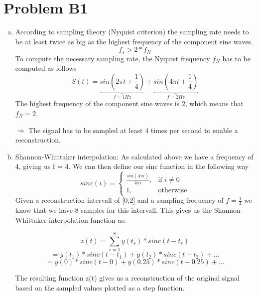 \documentclass[12pt]{article}
\begin{document}
\lstset{language=C++}


\section*{Problem B1}
\begin{enumerate}[a)]
	\item According to sampling theory (Nyquist criterion) the sampling rate needs to be at least twice as big as the highest frequency of the component sine waves.
	$$ f_s > 2 * f_N$$
	To compute the necessary sampling rate, the Nyquist frequency $f_N$ has to be computed as follows
	$$ S(t) = \underbrace{sin(2\pi t + \frac{1}{4})}_{f = 1Hz} + \underbrace{sin(4\pi t + \frac{1}{4})}_{f = 2Hz}$$
	The highest frequency of the component sine waves is $2$, which means that $f_N = 2$.

	$\Rightarrow$ The signal has to be sampled at least 4 times per second to enable a reconstruction.

	\item Shannon-Whittaker interpolation:
	As calculated above we have a frequency of 4, giving us f = 4.
	We can then define our sinc function in the following way
	\[
    		sinc(i)=
		\begin{cases}
    			 \frac{sin(4{\pi}i)}{4{\pi}i},& \text{if } i\neq 0\\
    			1,              & \text{otherwise}
		\end{cases}
	\]
    Given a reconstruction intervall of [0,2] and a sampling frequency of $f=\frac{1}{4}$ we know that we have 8 samples for this intervall. This gives us the Shannon-Whittaker interpolation function as:

	$$z(t) = \sum_{s=1}^{8} y(t_s) * sinc(t-t_s)$$
	$$=  y(t_1) * sinc(t-t_1) + y(t_2) * sinc(t-t_2) + ...$$
	$$=  y(0) * sinc(t-0) + y(0.25) * sinc(t-0.25) + ...$$

The resulting function {z(t)} gives us a reconstruction of the original signal based on the sampled values plotted as a step function.\\



\end{enumerate}
\end{document}
